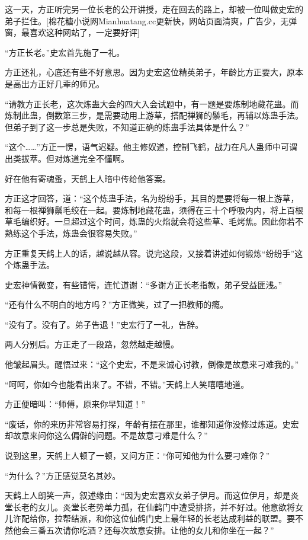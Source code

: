 
\begin{this_body}

这一天，方正听完另一位长老的公开讲授，走在回去的路上，却被一位叫做史宏的弟子拦住。[棉花糖小说网Mianhuatang.cc更新快，网站页面清爽，广告少，无弹窗，最喜欢这种网站了，一定要好评]

“方正长老。”史宏首先施了一礼。

方正还礼，心底还有些不好意思。因为史宏这位精英弟子，年龄比方正要大，原本是高出方正好几辈的师兄。

“请教方正长老，这次炼蛊大会的四大入会试题中，有一题是要炼制地藏花蛊。而炼制此蛊，倒数第三步，是需要动用上游草，搭配禅狮的鬃毛，再辅以炼蛊手法。但弟子到了这一步总是失败，不知道正确的炼蛊手法具体是什么？”

“这个……”方正一愣，语气迟疑。他主修奴道，控制飞鹤，战力在凡人蛊师中可谓出类拔萃。但对炼道完全不懂啊。

好在他有寄魂蚤，天鹤上人暗中传给他答案。

方正这才回答，道：“这个炼蛊手法，名为纷纷手，其目的是要将每一根上游草，和每一根禅狮鬃毛绞在一起。要炼制地藏花蛊，须得在三十个呼吸内内，将上百根草毛编织好。一旦超过这个时间，炼蛊的火焰就会将这些草、毛烤焦。因此你若不熟练这个手法，炼蛊会很容易失败。”

方正重复天鹤上人的话，越说越从容。说完这段，又接着讲述如何锻炼“纷纷手”这个炼蛊手法。

史宏神情微变，有些错愕，连忙道谢：“多谢方正长老指教，弟子受益匪浅。”

“还有什么不明白的地方吗？”方正微笑，过了一把教师的瘾。

“没有了。没有了。弟子告退！”史宏行了一礼，告辞。

两人分别后。方正走了一段路，忽然越走越慢。

他皱起眉头。醒悟过来：“这个史宏，不是来诚心讨教，倒像是故意来刁难我的。”

“呵呵，你如今也能看出来了。不错，不错。”天鹤上人笑嘻嘻地道。

方正便暗叫：“师傅，原来你早知道！”

“废话，你的来历非常容易打探，年龄有摆在那里，谁都知道你没修过炼道。史宏却故意来问你这么偏僻的问题。不是故意刁难是什么？”

说到这里，天鹤上人顿了一顿，又问方正：“你可知他为什么要刁难你？”

“为什么？”方正感觉莫名其妙。

天鹤上人朗笑一声，叙述缘由：“因为史宏喜欢女弟子伊月。而这位伊月，却是炎堂长老的女儿。炎堂长老势单力孤，在仙鹤门中遭受排挤，并不好过。他意欲将女儿许配给你，拉帮结派，和你这位仙鹤门史上最年轻的长老达成利益的联盟。要不然他会三番五次请你吃酒？还每次故意安排。让他的女儿和你坐在一起？”


\end{this_body}
